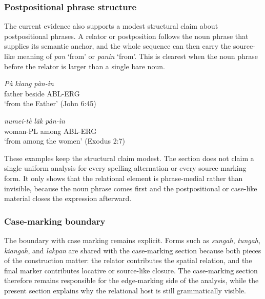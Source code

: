 \documentclass[
  11pt,
  a4paper,
]{article}
\newcommand{\tdim}[1]{\textit{#1}}
\newcommand{\tdimword}[1]{\textit{#1}}
\renewcommand{\textsc}[1]{{\footnotesize\MakeUppercase{#1}}}
\newcommand{\glossquote}[1]{`#1'}
\begin{document}
\subsubsection{Postpositional phrase
structure}\label{postpositional-phrase-structure}

The current evidence also supports a modest structural claim about
postpositional phrases. A relator or postposition follows the noun
phrase that supplies its semantic anchor, and the whole sequence can
then carry the source-like meaning of \tdim{pan} \glossquote{from} or
\tdim{panin} \glossquote{from}. This is clearest when the noun phrase
before the relator is larger than a single bare noun.

\begin{exe}
\ex \label{ex:rel-kiang-panin-pa}
\gll \tdimword{Pà} \tdimword{kìang} \tdimword{pàn-ìn} \\
     father beside \textsc{abl}-\textsc{erg} \\
\glt \glossquote{from the Father} (John 6:45)
\end{exe}

\begin{exe}
\ex \label{ex:rel-lak-panin-numeite}
\gll \tdimword{numei-tè} \tdimword{lāk} \tdimword{pàn-ìn} \\
     woman-\textsc{pl} among \textsc{abl}-\textsc{erg} \\
\glt \glossquote{from among the women} (Exodus 2:7)
\end{exe}

These examples keep the structural claim modest. The section does not
claim a single uniform analysis for every spelling alternation or every
source-marking form. It only shows that the relational element is
phrase-medial rather than invisible, because the noun phrase comes first
and the postpositional or case-like material closes the expression
afterward.

\subsubsection{Case-marking boundary}\label{case-marking-boundary}

The boundary with case marking remains explicit. Forms such as
\tdim{sungah}, \tdim{tungah}, \tdim{kiangah}, and \tdim{lakpan} are
shared with the case-marking section because both pieces of the
construction matter: the relator contributes the spatial relation, and
the final marker contributes locative or source-like closure. The
case-marking section therefore remains responsible for the edge-marking
side of the analysis, while the present section explains why the
relational host is still grammatically visible.
\end{document}
